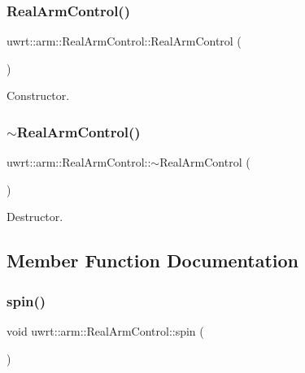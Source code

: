 \subsubsection{\texorpdfstring{Real\+Arm\+Control()}{RealArmControl()}}
{\footnotesize\ttfamily uwrt\+::arm\+::\+Real\+Arm\+Control\+::\+Real\+Arm\+Control (\begin{DoxyParamCaption}{ }\end{DoxyParamCaption})}



Constructor. 

\mbox{\label{classuwrt_1_1arm_1_1_real_arm_control_a1f201262f19bfae812e33d4ce47f9ba2}} 
\subsubsection{\texorpdfstring{$\sim$\+Real\+Arm\+Control()}{~RealArmControl()}}
{\footnotesize\ttfamily uwrt\+::arm\+::\+Real\+Arm\+Control\+::$\sim$\+Real\+Arm\+Control (\begin{DoxyParamCaption}{ }\end{DoxyParamCaption})}



Destructor. 



\subsection{Member Function Documentation}
\mbox{\label{classuwrt_1_1arm_1_1_real_arm_control_ac174f649dd8c5a48250e0b84b4442b5e}} 
\subsubsection{\texorpdfstring{spin()}{spin()}}
{\footnotesize\ttfamily void uwrt\+::arm\+::\+Real\+Arm\+Control\+::spin (\begin{DoxyParamCaption}{ }\end{DoxyParamCaption})}

